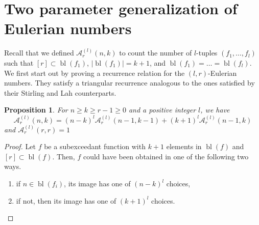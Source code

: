 \documentclass{article}
\newcommand{\eul}{\mathcal{A}}
\DeclareMathOperator{\bl}{bl}
\newtheorem{proposition}[theorem]{Proposition}
\theoremstyle{definition}
\numberwithin{equation}{section}
\begin{document}

\section{Two parameter generalization of Eulerian numbers}\label{sec: 2-para }

Recall that we defined $\eul_r^{(l)}(n,k)$ to count the number of $l$-tuples $(f_1,\dots, f_l)$ such that $[r]\subset \bl(f_1)$, $|\bl(f_1)|=k+1$, and $\bl(f_1)=\dots=\bl(f_l)$. We first start out by proving a recurrence relation for the $(l,r)$-Eulerian numbers. They satisfy a triangular recurrence analogous to the ones satisfied by their Stirling and Lah counterparts.
\begin{proposition}
    For $n\ge k\ge r-1\ge0$ and a positive integer $l$, we have 
    \begin{equation}
        \eul_r^{(l)}(n,k)=(n-k)^l \eul_r^{(l)}(n-1,k-1)+(k+1)^l\eul_r^{(l)}(n-1,k)
    \end{equation}
    and $\eul_r^{(l)}(r,r)=1$
\end{proposition}
\begin{proof}
     Let $f$ be a subexceedant function with $k+1$ elements in $\bl(f)$ and $[r]\subset \bl(f)$. Then, $f$ could have been obtained in one of the following two ways.
    \begin{enumerate}
        \item if $n\in \bl(f_i)$, its image has one of $(n-k)^l$ choices,
        \item if not, then its image has one of $(k+1)^l$ choices.
    \end{enumerate}
\end{proof}
\end{document}
